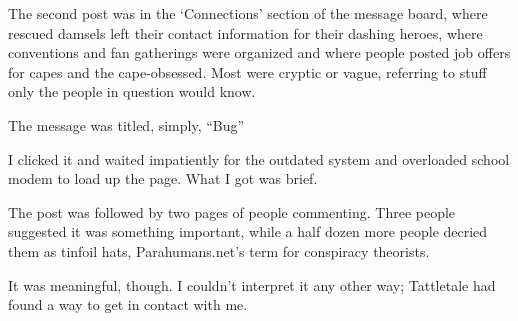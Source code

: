 The second post was in the `Connections' section of the message board, where rescued damsels left their contact information for their dashing heroes, where conventions and fan gatherings were organized and where people posted job offers for capes and the cape-obsessed.  Most were cryptic or vague, referring to stuff only the people in question would know.



The message was titled, simply, ``Bug''



I clicked it and waited impatiently for the outdated system and overloaded school modem to load up the page.  What I got was brief.





The post was followed by two pages of people commenting.  Three people suggested it was something important, while a half dozen more people decried them as tinfoil hats, Parahumans.net's term for conspiracy theorists.



It was meaningful, though.  I couldn't interpret it any other way; Tattletale had found a way to get in contact with me.





